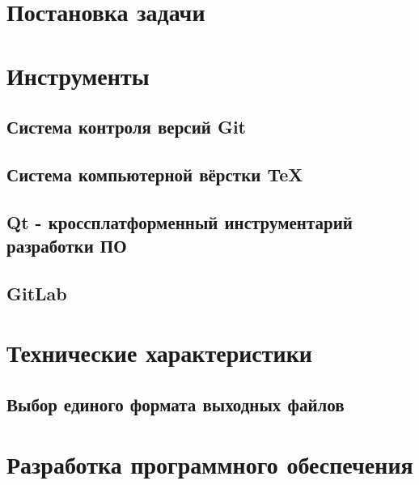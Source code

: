 \section{Постановка задачи}
\setcounter{figure}{0}


\section{Инструменты}
\setcounter{figure}{0}
\subsection{Система контроля версий Git}

\subsection{Система компьютерной вёрстки \TeX}

\subsection{Qt - кроссплатформенный инструментарий разработки ПО}

\subsection{GitLab}


\section{Технические характеристики}

\subsection{Выбор единого формата выходных файлов}


\section{Разработка программного обеспечения}
\setcounter{figure}{0}
 
% 

% 

